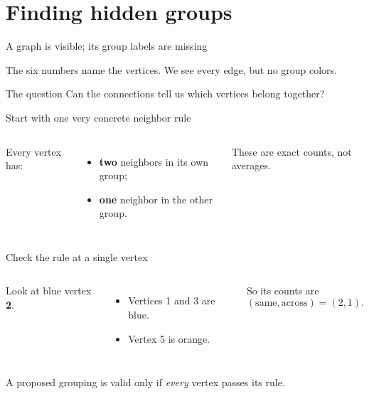 \section{Finding hidden groups}

\begin{frame}{A graph is visible; its group labels are missing}
\begin{center}
\end{center}
The six numbers name the vertices. We see every edge, but no group colors.
\begin{block}{The question}
Can the connections tell us which vertices belong together?
\end{block}
\end{frame}

\begin{frame}{Start with one very concrete neighbor rule}
\begin{columns}[c]
Every vertex has:
\begin{itemize}
\item \textbf{two} neighbors in its own group;
\item \textbf{one} neighbor in the other group.
\end{itemize}
These are exact counts, not averages.
\end{columns}
\end{frame}

\begin{frame}{Check the rule at a single vertex}
\begin{columns}[c]
Look at blue vertex \textbf{2}.
\begin{itemize}
\item Vertices 1 and 3 are blue.
\item Vertex 5 is orange.
\end{itemize}
So its counts are
\[
       (\text{same},\text{across})=(2,1).
\]
\end{columns}
A proposed grouping is valid only if \emph{every} vertex passes its rule.
\end{frame}

